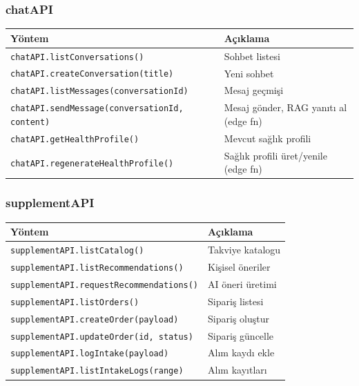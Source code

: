 \subsubsection{chatAPI}

\begin{table}[H]
\centering
\small
\begin{tabular}{|l|p{}|}
\hline
\textbf{Yöntem} & \textbf{Açıklama} \\
\hline
\texttt{chatAPI.listConversations()}              & Sohbet listesi \\
\texttt{chatAPI.createConversation(title)}        & Yeni sohbet \\
\texttt{chatAPI.listMessages(conversationId)}     & Mesaj geçmişi \\
\texttt{chatAPI.sendMessage(conversationId, content)} & Mesaj gönder, RAG yanıtı al (edge fn) \\
\texttt{chatAPI.getHealthProfile()}               & Mevcut sağlık profili \\
\texttt{chatAPI.regenerateHealthProfile()}        & Sağlık profili üret/yenile (edge fn) \\
\hline
\end{tabular}
\end{table}

\subsubsection{supplementAPI}

\begin{table}[H]
\centering
\small
\begin{tabular}{|l|p{}|}
\hline
\textbf{Yöntem} & \textbf{Açıklama} \\
\hline
\texttt{supplementAPI.listCatalog()}              & Takviye katalogu \\
\texttt{supplementAPI.listRecommendations()}      & Kişisel öneriler \\
\texttt{supplementAPI.requestRecommendations()}   & AI öneri üretimi \\
\texttt{supplementAPI.listOrders()}               & Sipariş listesi \\
\texttt{supplementAPI.createOrder(payload)}       & Sipariş oluştur \\
\texttt{supplementAPI.updateOrder(id, status)}    & Sipariş güncelle \\
\texttt{supplementAPI.logIntake(payload)}         & Alım kaydı ekle \\
\texttt{supplementAPI.listIntakeLogs(range)}      & Alım kayıtları \\
\hline
\end{tabular}
\end{table}

